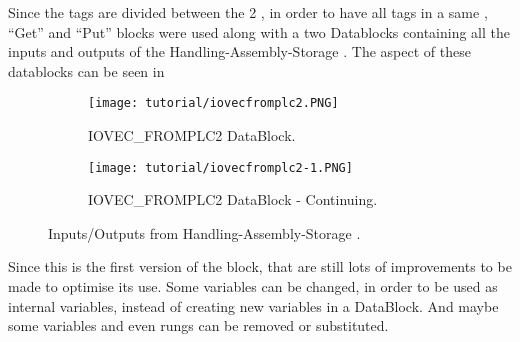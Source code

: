 \begin{observation}
  Since the tags are divided between the 2 \PLCs{}, in order to have all tags in
  a same \PLC, ``Get'' and ``Put'' blocks were used along with a two Datablocks
  containing all the inputs and outputs of the Handling-Assembly-Storage \PLC.
  The aspect of these datablocks can be seen in 
\end{observation}
\begin{figure}[H] \centering
\begin{subfigure}[h]{\textwidth} \centering
 \texttt{[image: tutorial/iovecfromplc2.PNG]}
  \caption{IOVEC\_FROMPLC2 DataBlock.}
  \label{fig:iovecFromPlc}
\end{subfigure}
\begin{subfigure}[h]{\textwidth} \centering
 \texttt{[image: tutorial/iovecfromplc2-1.PNG]}
  \caption{IOVEC\_FROMPLC2 DataBlock - Continuing.}
  \label{fig:iovecFromPlctwo}
\end{subfigure}
\caption{Inputs\slash Outputs from Handling-Assembly-Storage \PLC.}
\end{figure}

\begin{observation}
  Since this is the first version of the block, that are still lots of
  improvements to be made to optimise its use. Some variables can be changed, in
  order to be used as 
  internal variables, instead of creating new variables in a DataBlock. And
  maybe some variables and even rungs can be removed or substituted.
\end{observation}
